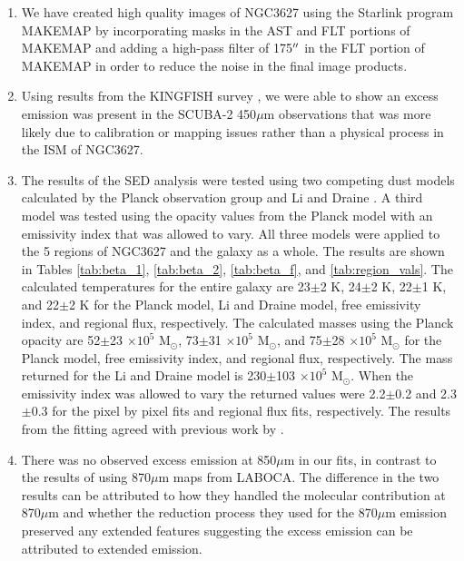 \begin{enumerate}

\item{We have created high quality images of NGC3627 using the Starlink program MAKEMAP by incorporating masks in the AST and FLT portions of MAKEMAP and adding a high-pass filter of 175$\mbox{$^{\prime\prime}$}$ in the FLT portion of MAKEMAP in order to reduce the noise in the final image products.}

\item{Using results from the KINGFISH survey \citep{kennicutt2011}, we were able to show an excess emission was present in the SCUBA-2 450$\mu$m observations that was more likely due to calibration or mapping issues rather than a physical process in the ISM of NGC3627.}

\item{The results of the SED analysis were tested using two competing dust models calculated by the Planck observation group \citep{planckxxv2011} and Li and Draine \citep{li2001}.  A third model was tested using the opacity values from the Planck model with an emissivity index that was allowed to vary.  All three models were applied to the 5 regions of NGC3627 and the galaxy as a whole.  The results are shown in Tables \ref{tab:beta_1}, \ref{tab:beta_2}, \ref{tab:beta_f}, and \ref{tab:region_vals}.  The calculated temperatures for the entire galaxy are 23$\pm$2 K, 24$\pm$2 K, 22$\pm$1 K, and 22$\pm$2 K for the Planck model, Li and Draine model, free emissivity index, and regional flux, respectively.  The calculated masses using the Planck opacity are 52$\pm$23 $\times10^5$ M$_\odot$, 73$\pm$31 $\times10^5$ M$_\odot$, and 75$\pm$28 $\times10^5$ M$_\odot$ for the Planck model, free emissivity index, and regional flux, respectively.  The mass returned for the Li and Draine model is 230$\pm$103 $\times10^5$ M$_\odot$.  When the emissivity index was allowed to vary the returned values were 2.2$\pm$0.2 and 2.3$\pm$0.3 for the pixel by pixel fits and regional flux fits, respectively.  The results from the fitting agreed with previous work by \cite{galametz2012}.}

\item{There was no observed excess emission at 850$\mu$m in our fits, in contrast to the results of \cite{galametz2014} using 870$\mu$m maps from LABOCA.  The difference in the two results can be attributed to how they handled the molecular contribution at 870$\mu$m and whether the reduction process they used for the 870$\mu$m emission preserved any extended features suggesting the excess emission can be attributed to extended emission.}


\end{enumerate}

